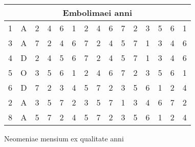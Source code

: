 {\begin{tabular}{@{} c c *{13}{c} @{}}
\multicolumn{15}{c}{Embolimaei anni}\\
\midrule
 1 & A & 2 & 4 & 6 & 1 & 2 & 4 & 6 & 7 & 2 & 3 & 5 & 6 & 1 \\
 3 & A & 7 & 2 & 4 & 6 & 7 & 2 & 4 & 5 & 7 & 1 & 3 & 4 & 6 \\
 4 & D & 2 & 4 & 5 & 6 & 7 & 2 & 4 & 5 & 7 & 1 & 3 & 4 & 6 \\
 5 & O & 3 & 5 & 6 & 1 & 2 & 4 & 6 & 7 & 2 & 3 & 5 & 6 & 1 \\
 6 & D & 7 & 2 & 3 & 4 & 5 & 7 & 2 & 3 & 5 & 6 & 1 & 2 & 4 \\
 2 & A & 3 & 5 & 7 & 2 & 3 & 5 & 7 & 1 & 3 & 4 & 6 & 7 & 2 \\
 8 & A & 5 & 7 & 2 & 4 & 5 & 7 & 2 & 3 & 5 & 6 & 1 & 2 & 4 \\
\bottomrule
\end{tabular}
%
\caption{Neomeniae mensium ex qualitate anni}
\label{tab:p133}
%
}
